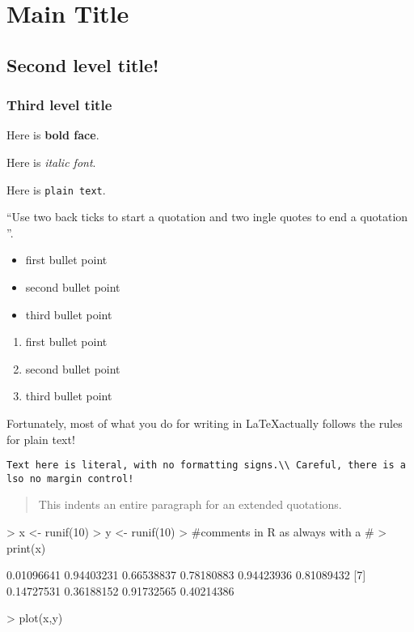 \documentclass{article}
\begin{document}



\section*{Main Title}

\subsection*{Second level title!}

\subsubsection*{Third level title}

Here is \textbf{bold face}.

Here is \textit{italic font}.

Here is \texttt{plain text}.


``Use two back ticks to start a quotation and two ingle quotes to end a quotation ''. 

\begin{itemize}
  \item first bullet point
  \item second bullet point
  \item third bullet point
\end{itemize}

\begin{enumerate}
  \item first bullet point
  \item second bullet point
  \item third bullet point
\end{enumerate}

Fortunately, most of what you do for writing in \LaTeX actually follows the rules for plain text!

\begin{verbatim}
Text here is literal, with no formatting signs.\\ Careful, there is a lso no margin control!
\end{verbatim}

\begin{quote}
This indents an entire paragraph for an extended quotations.
\end{quote}

\begin{Schunk}
\begin{Sinput}
> x <- runif(10)
> y <- runif(10)
> #comments in R as always with a #
> print(x)
\end{Sinput}
\begin{Soutput}
 [1] 0.01096641 0.94403231 0.66538837 0.78180883 0.94423936 0.81089432
 [7] 0.14727531 0.36188152 0.91732565 0.40214386
\end{Soutput}
\begin{Sinput}
> plot(x,y)
\end{Sinput}
\end{Schunk}
\end{document}

